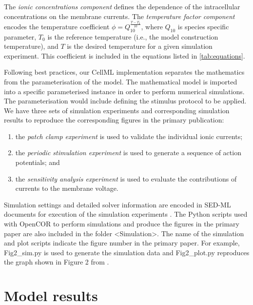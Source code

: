 \documentclass[fleqn,10pt]{physiome}
\begin{document}
The \emph{ionic concentrations component} defines the dependence of the intracellular concentrations on the membrane currents. The  \emph{temperature factor component} encodes the temperature coefficient $\phi=Q_{10}^{\frac{T-T_0}{10}}$, where $Q_{10}$ is species specific parameter, $T_{0}$ is the reference temperature (i.e., the model construction temperature), and $T$ is the desired temperature for a given simulation experiment. This coefficient is included in the equations listed in \autoref{tab:equations}.

Following best practices, our CellML implementation separates the mathematics from the parameterisation of the model. The mathematical model is imported into a specific parameterised instance in order to perform numerical simulations. The parameterisation would include defining the stimulus protocol to be applied. We have three sets of simulation experiments and corresponding simulation results to reproduce the corresponding figures in the primary publication: 
\begin{enumerate}[noitemsep] 
\item the \emph{patch clamp experiment} is used to validate the individual ionic currents;
\item the \emph{periodic stimulation experiment} is used to generate a sequence of action potentials; and
\item the \emph{sensitivity analysis experiment} is used to evaluate the contributions of currents to the membrane voltage.
\end{enumerate}

Simulation settings and detailed solver information are encoded in SED-ML documents for execution of the simulation experiments \citep{waltemath_reproducible_2011}. The Python scripts used with OpenCOR \citep{garny_opencor_2015} to perform simulations and produce the figures in the primary paper are also included in the folder <Simulation>. The name of the simulation and plot scripts indicate the figure number in the primary paper. For example, Fig2\_sim.py is used to generate the simulation data and Fig2\_plot.py reproduces the graph shown in Figure 2 from \citet{poh2012quantitative}.

\section{Model results}
\label{sed:modelResults}
\end{document}

